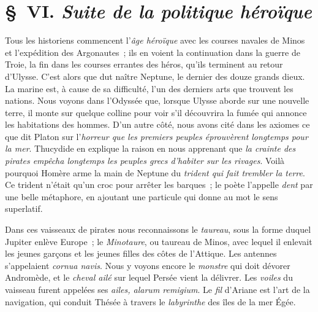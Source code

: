 \documentclass[french,twoside]{book} %
\begin{document}
\section[{§ VI. Suite de la politique héroïque}]{§ VI. {\itshape Suite de la politique héroïque}}
\noindent Tous les historiens commencent l’{\itshape âge héroïque} avec les courses navales de Minos et l’expédition des Argonautes ; ils en voient la continuation dans la guerre de Troie, la fin dans les courses errantes des héros, qu’ils terminent au retour d’Ulysse. C’est alors que dut naître Neptune, le dernier des douze grands dieux. La marine est, à cause de sa difficulté, l’un des derniers arts que trouvent les nations. Nous voyons dans l’Odyssée que, lorsque Ulysse aborde sur une nouvelle terre, il monte sur quelque colline pour voir s’il découvrira la fumée qui annonce les habitations des hommes. D’un autre côté, nous avons cité dans les axiomes ce que dit Platon sur l’\emph{{\itshape horreur que les premiers peuples éprouvèrent longtemps pour la mer}}. Thucydide en explique la raison en nous apprenant que \emph{{\itshape la crainte des pirates empêcha longtemps les peuples grecs d’habiter sur les rivages}}. Voilà pourquoi Homère arme la main de Neptune du \emph{{\itshape trident qui fait trembler la terre}}. Ce trident n’était qu’un croc pour arrêter les  barques ; le poète l’appelle {\itshape dent} par une belle métaphore, en ajoutant une particule qui donne au mot le sens superlatif.\par
Dans ces vaisseaux de pirates nous reconnaissons le {\itshape taureau}, sous la forme duquel Jupiter enlève Europe ; le {\itshape Minotaure}, ou taureau de Minos, avec lequel il enlevait les jeunes garçons et les jeunes filles des côtes de l’Attique. Les antennes s’appelaient {\itshape cornua navis}. Nous y voyons encore le {\itshape monstre} qui doit dévorer Andromède, et le {\itshape cheval ailé} sur lequel Persée vient la délivrer. Les {\itshape voiles} du vaisseau furent appelées ses {\itshape ailes, alarum remigium}. Le {\itshape fil} d’Ariane est l’art de la navigation, qui conduit Thésée à travers le {\itshape labyrinthe} des îles de la mer Égée.\par
\end{document}
